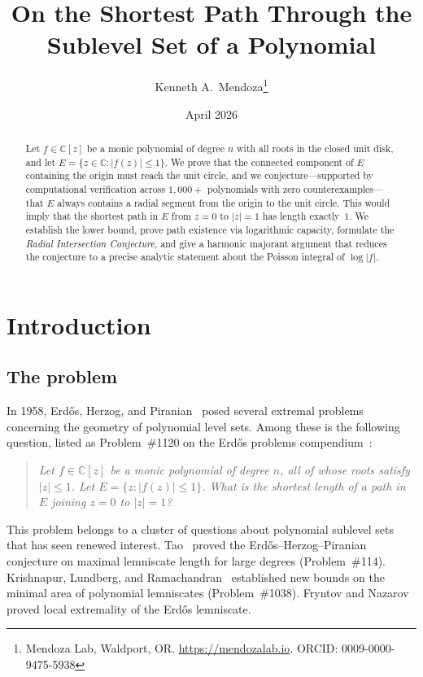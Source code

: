 \documentclass[11pt]{article}
\title{On the Shortest Path Through the Sublevel Set of a Polynomial}
\author{Kenneth A.\ Mendoza\thanks{Mendoza Lab, Waldport, OR. \url{https://mendozalab.io}. ORCID: 0009-0000-9475-5938}}
\date{April 2026}
\theoremstyle{definition}
\theoremstyle{remark}
\begin{document}
\maketitle

\begin{abstract}
Let $f\in\mathbb{C}[z]$ be a monic polynomial of degree $n$ with all roots in the closed unit disk, and let $E=\{z\in\mathbb{C}:|f(z)|\leq 1\}$. We prove that the connected component of $E$ containing the origin must reach the unit circle, and we conjecture---supported by computational verification across $1{,}000+$ polynomials with zero counterexamples---that $E$ always contains a radial segment from the origin to the unit circle. This would imply that the shortest path in $E$ from $z=0$ to $|z|=1$ has length exactly~$1$. We establish the lower bound, prove path existence via logarithmic capacity, formulate the \emph{Radial Intersection Conjecture}, and give a harmonic majorant argument that reduces the conjecture to a precise analytic statement about the Poisson integral of $\log|f|$.
\end{abstract}

\section{Introduction}

\subsection{The problem}
In 1958, Erd\H{o}s, Herzog, and Piranian~\cite{EHP58} posed several extremal problems concerning the geometry of polynomial level sets. Among these is the following question, listed as Problem~\#1120 on the Erd\H{o}s problems compendium~\cite{EP}:

\begin{quote}
\emph{Let $f\in\mathbb{C}[z]$ be a monic polynomial of degree $n$, all of whose roots satisfy $|z|\leq 1$. Let $E=\{z:|f(z)|\leq 1\}$. What is the shortest length of a path in $E$ joining $z=0$ to $|z|=1$?}
\end{quote}

This problem belongs to a cluster of questions about polynomial sublevel sets that has seen renewed interest. Tao~\cite{Tao25} proved the Erd\H{o}s--Herzog--Piranian conjecture on maximal lemniscate length for large degrees (Problem~\#114). Krishnapur, Lundberg, and Ramachandran~\cite{KLR25} established new bounds on the minimal area of polynomial lemniscates (Problem~\#1038). Fryntov and Nazarov~\cite{FN25} proved local extremality of the Erd\H{o}s lemniscate.
\end{document}
